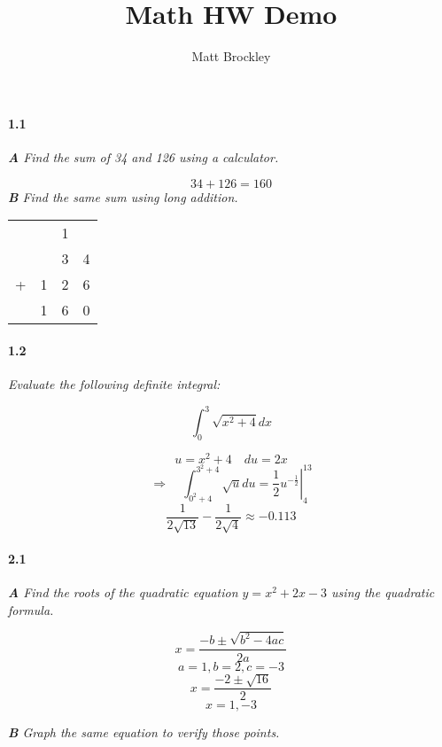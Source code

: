 \documentclass[12pt, letterpaper]{article}
\author{Matt Brockley}
\title{Math HW Demo}
\begin{document}
	\paragraph{1.1}
		\textit{
			\textbf{A} Find the sum of 34 and 126 using a calculator.
		}
	
	$$
		34 + 126 = 160
	$$
		\textit{
			\textbf{B} Find the same sum using long addition.
		}
	
	\begin{center}
		\begin{tabular}{cccc}
			  &   & 1 & \\
			  &   & 3 & 4 \\
			+ & 1 & 2 & 6\\
			\hline
			  & 1 & 6 & 0\\
		\end{tabular}				
	\end{center}


	\paragraph{1.2}
		\textit{
			Evaluate the following definite integral:}
			
			$$
				\int_{0}^{3}\sqrt{x^2+4} dx
			$$

		
		$$
			u = x^2 + 4
			\quad
			du = 2x
		$$
		$$
			\Rightarrow\quad
			\int_{0^2+4}^{3^2+4} \sqrt{u}du
			= \left. \frac{1}{2} u^{-\frac{1}{2}}
			\right |_{4}^{13}
		$$	
		$$
			\frac{1}{2\sqrt{13}} - 
			\frac{1}{2\sqrt{4}}
			\approx -0.113
		$$	 
		
	\paragraph{2.1}
		\textit{ \textbf{A} Find the roots of the quadratic equation $y = x^2 +2x -3$ using the quadratic formula.}
		
		\begin{equation}
			x = \frac{-b \pm \sqrt{b^2 - 4ac}}{2a}
		\end{equation}
		\begin{equation}
			a = 1, b = 2, c = -3
		\end{equation}
		\begin{equation}
			x = \frac{-2\pm\sqrt{16}}{2}
		\end{equation}
		\begin{equation}
			x = 1, -3
		\end{equation}
	
		\textit{\textbf{B} Graph the same equation to verify those points.}
		
\end{document}
